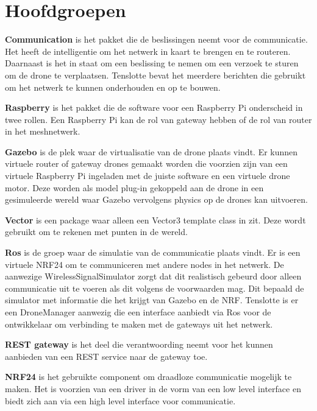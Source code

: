 \documentclass[a4paper, 11pt, oneside]{report}
\begin{document}
\section{Hoofdgroepen}

\textbf{Communication} is het pakket die de beslissingen neemt voor de communicatie.
Het heeft de intelligentie om het netwerk in kaart te brengen en te routeren.
Daarnaast is het in staat om een beslissing te nemen om een verzoek te sturen om de drone te verplaatsen.
Tenslotte bevat het meerdere berichten die gebruikt om het netwerk te kunnen onderhouden en op te bouwen.    

\textbf{Raspberry} is het pakket die de software voor een Raspberry Pi onderscheid in twee rollen. Een Raspberry Pi kan de rol van gateway hebben of de rol van router in het meshnetwerk.

\textbf{Gazebo} is de plek waar de virtualisatie van de drone plaats vindt.
Er kunnen virtuele router of gateway drones gemaakt worden die voorzien zijn van een virtuele Raspberry Pi ingeladen met de juiste software en een virtuele drone motor.
Deze worden als model plug-in gekoppeld aan de drone in een gesimuleerde wereld waar Gazebo vervolgens physics op de drones kan uitvoeren. 


\textbf{Vector} is een package waar alleen een Vector3 template class in zit. Deze wordt gebruikt om te rekenen met punten in de wereld. 

\textbf{Ros} is de groep waar de simulatie van de communicatie plaats vindt.
Er is een virtuele NRF24 om te communiceren met andere nodes in het netwerk.
De aanwezige WirelessSignalSimulator zorgt dat dit realistisch gebeurd door alleen communicatie uit te voeren als dit volgens de voorwaarden mag.
Dit bepaald de simulator met informatie die het krijgt van Gazebo en de NRF.
Tenslotte is er een DroneManager aanwezig die een interface aanbiedt via Ros voor de ontwikkelaar om verbinding te maken met de gateways uit het netwerk.

\textbf{REST gateway} is het deel die verantwoording neemt voor het kunnen aanbieden van een REST service naar de gateway toe.

\textbf{NRF24} is het gebruikte component om draadloze communicatie mogelijk te maken. Het is voorzien van een driver in de vorm van een low level interface en biedt zich aan via een high level interface voor communicatie.
\end{document}

